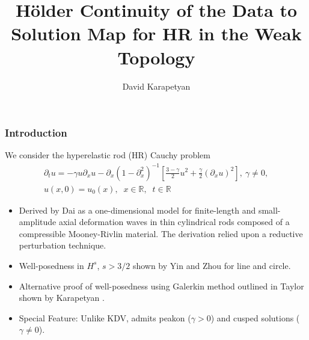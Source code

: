 \documentclass{beamer}
\date{}
\title{H\"older Continuity of the Data to Solution Map for HR in the
Weak Topology}
\author{David Karapetyan}
\institute{University of Notre Dame}
\numberwithin{equation}{section}
\newcommand{\rr}{\mathbb{R}}
\newcommand{\p}{\partial}
\begin{document}
\begin{frame}
    \titlepage
\end{frame}



        \begin{frame}
            \frametitle{Introduction}
We consider the hyperelastic rod (HR) Cauchy problem
\begin{gather*}
 \p_t u =  -\gamma u \p_x u -
 \p_{x} (1 - \p_{x}^{2})^{-1} \left[ \frac{3-\gamma}{2}u^2 +
\frac{\gamma}{2} \left( \p_x u \right)^2
\right], \ \gamma \neq 0,
\label{hyperelastic-rod-equation}
\\
 u(x,0) = u_0(x), \; \; x \in \rr, \; \; t \in \rr
\label{init-cond}
\end{gather*}
\begin{itemize}
    \item
        \pause
        Derived by Dai \cite{Dai_1998_Model-equations} as a one-dimensional 
        model for finite-length and
        small-amplitude axial deformation waves in thin cylindrical
        rods composed of a compressible Mooney-Rivlin
        material. The derivation relied upon a reductive perturbation technique.
    \item 
       \pause 
        Well-posedness in $H^{s}$, $s > 3/2$ shown by Yin
        \cite{Yin_2003_On-the-Cauchy-p} and Zhou
        \cite{Zhou_2005_Local-well-pose} for line and circle.
    \item 
       \pause 
        Alternative proof of well-posedness using Galerkin method
outlined in Taylor \cite{Taylor_1991_Pseudodifferent} shown by Karapetyan \cite{Karapetyan:2010fk}. 
\item 
   \pause 
    Special Feature: Unlike KDV, admits peakon ($\gamma > 0$) and cusped
    solutions ($\gamma \neq 0$).
\end{itemize}
\end{frame}
\end{document}
